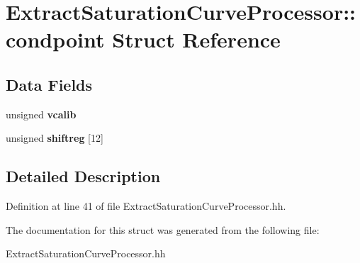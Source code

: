 \section{Extract\-Saturation\-Curve\-Processor\-:\-:condpoint Struct Reference}
\label{structExtractSaturationCurveProcessor_1_1condpoint}
\subsection*{Data Fields}
\begin{DoxyCompactItemize}
\item 
unsigned {\bfseries vcalib}\label{structExtractSaturationCurveProcessor_1_1condpoint_a5afe22b9bd585fbb0c2c9885a131871a}

\item 
unsigned {\bfseries shiftreg} [12]\label{structExtractSaturationCurveProcessor_1_1condpoint_a228d6fdd6a981203ef981dc4f0bdd92b}

\end{DoxyCompactItemize}


\subsection{Detailed Description}


Definition at line 41 of file Extract\-Saturation\-Curve\-Processor.\-hh.



The documentation for this struct was generated from the following file\-:\begin{DoxyCompactItemize}
\item 
Extract\-Saturation\-Curve\-Processor.\-hh\end{DoxyCompactItemize}
